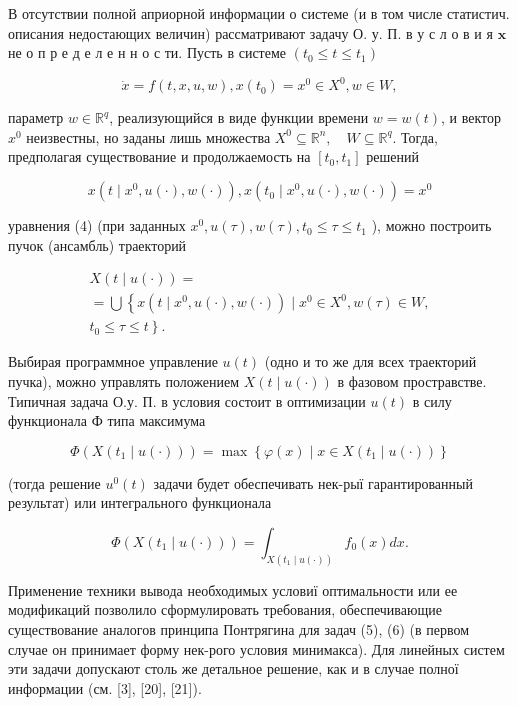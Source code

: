 \documentclass[10pt]{article}
\begin{document}
В отсутствии полной априорной информации о системе (и в том числе статистич. описания недостающих величин) рассматривают задачу О. у. П. в у с л о в и я $\mathbf{x}$ не о п р е д е л е н н о с ти. Пусть в системе $\left(t_{0} \leqslant t \leqslant t_{1}\right)$

\[
\dot{x}=f(t, x, u, w), x\left(t_{0}\right)=x^{0} \in X^{0}, w \in W,
\]

параметр $w \in \mathbb{R}^{q}$, реализующийся в виде функции времени $w=w(t)$, и вектор $x^{0}$ неизвестны, но заданы лишь множества $X^{0} \subseteq \mathbb{R}^{n}, \quad W \subseteq \mathbb{R}^{q}$. Тогда, предполагая существование и продолжаемость на $\left[t_{0}, t_{1}\right]$ решений

\[
x\left(t \mid x^{0}, u(\cdot), w(\cdot)\right), x\left(t_{0} \mid x^{0}, u(\cdot), w(\cdot)\right)=x^{0}
\]

уравнения (4) (при заданных $x^{0}, u(\tau), w(\tau), t_{0} \leqslant \tau \leqslant t_{1}$ ), можно построить пучок (ансамбль) траекторий

\[
\begin{gathered}
X(t \mid u(\cdot))= \\
=\bigcup\left\{x\left(t \mid x^{0}, u(\cdot), w(\cdot)\right) \mid x^{0} \in X^{0}, w(\tau) \in W,\right. \\
\left.t_{0} \leqslant \tau \leqslant t\right\} .
\end{gathered}
\]

Выбирая программное управление $u(t)$ (одно и то же для всех траекторий пучка), можно управлять положением $X(t \mid u(\cdot))$ в фазовом простравстве. Типичная задача О.у. П. в условия состоит в оптимизации $u(t)$ в силу функционала Ф типа максимума

\[
\Phi\left(X\left(t_{1} \mid u(\cdot)\right)\right)=\max \left\{\varphi(x) \mid x \in X\left(t_{1} \mid u(\cdot)\right)\right\}
\]

(тогда решение $u^{0}(t)$ задачи будет обеспечивать нек-рыї гарантированный результат) или интегрального функционала

\[
\Phi\left(X\left(t_{1} \mid u(\cdot)\right)\right)=\int_{X\left(t_{1} \mid u(\cdot)\right)} f_{0}(x) d x .
\]

Применение техники вывода необходимых условиї оптимальности или ее модификаций позволило сформулировать требования, обеспечивающие существование аналогов принципа Понтрягина для задач (5), (6) (в первом случае он принимает форму нек-рого условия минимакса). Для линейных систем эти задачи допускают столь же детальное решение, как и в случае полної информации (см. [3], [20], [21]).
\end{document}
